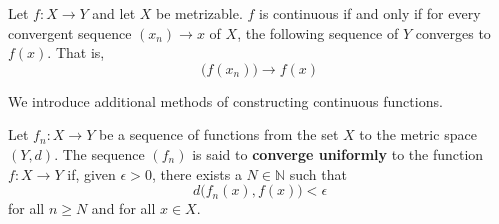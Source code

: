   \begin{theorem}
    Let $f: X \longrightarrow Y$ and let $X$ be metrizable. $f$ is continuous if and only if for every convergent sequence $(x_n) \rightarrow x$ of $X$, the following sequence of $Y$ converges to $f(x)$. That is, 
    \begin{equation}
      \big( f(x_n) \big) \longrightarrow f(x)
    \end{equation}
  \end{theorem}

  We introduce additional methods of constructing continuous functions. 

  \begin{definition}
    Let $f_n: X \longrightarrow Y$ be a sequence of functions from the set $X$ to the metric space $(Y, d)$. The sequence $(f_n)$ is said to \textbf{converge uniformly} to the function $f: X \longrightarrow Y$ if, given $\epsilon > 0$, there exists a $N \in \mathbb{N}$ such that
    \begin{equation}
      d\big( f_n(x), f(x)\big) < \epsilon
    \end{equation}
    for all $n \geq N$ and for all $x \in X$. 
  \end{definition}

